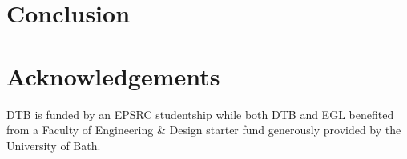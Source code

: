 

\section{Conclusion}





\section*{Acknowledgements}
DTB is funded by an EPSRC studentship while both DTB and EGL benefited from a Faculty of Engineering \& Design starter fund generously provided by the University of Bath. 


\renewcommand{\bibname}{References}
\clearpage
%

%


